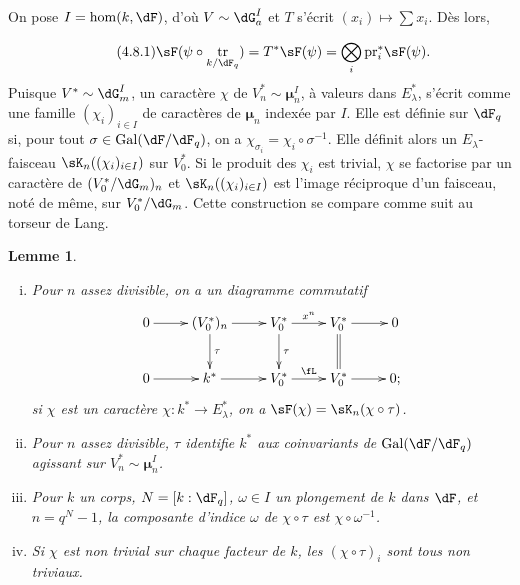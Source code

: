 \documentclass[oneside]{book}
\DeclareMathOperator{\gal}{Gal}
\DeclareMathOperator{\tr}{tr}
\newcommand{\dmu}{{\bm\mu}}
\newcommand{\pr}{\mathrm{pr}} %
\theoremstyle{sga-source}
\theoremstyle{sga-source-dash}
\theoremstyle{sga-source-dotdash}
\theoremstyle{sga-source-number-note-dash}
\theoremstyle{sga-source-note-number-dotdash}
\theoremstyle{sga-source-example-dotdash}
\theoremstyle{sga-source-inline-number}
\theoremstyle{sga-source-bare-number}
\theoremstyle{sga-source}
\newtheorem{lemma_}[subsection]{Lemme}
\newcommand{\PrintPage}[1]{}\newcommand{\MathPage}[1]{}\newcommand{\PrintCite}[2]{#1}\newcommand{\var}[3]{#2}
\begin{document}
On pose $I=\hom(k,\dF)$, d'où $V\sim \dG_a^I$ et $T$ s'écrit 
$(x_i)\mapsto \sum x_i$. Dès lors, 
\PrintPage{200}
\begin{equation*}\tag{4.8.1}\label{VI:eq:4-8-1}
  \sF(\psi\circ \tr_{k/\dF_q}) = T^\ast \sF(\psi) = \bigotimes_i \pr_i^\ast \sF(\psi) \text{.} 
\end{equation*}
Puisque $V^\ast\sim \dG_m^I$, un caractère $\chi$ de $V_n^\ast\sim \dmu_n^I$, 
à valeurs dans $E_\lambda^\ast$, s'écrit comme une famille 
$(\chi_i)_{i\in I}$ de caractères de $\dmu_n$ \var{indénée par $I$}{indexée par $I$}{S45-SOL-0817}. Elle est 
définie sur $\dF_q$ si, pour tout $\sigma\in \gal(\dF/\dF_q)$, on a 
$\chi_{\sigma_i} = \chi_i\circ \sigma^{-1}$. Elle définit alors un 
$E_\lambda$-faisceau $\sK_n((\chi_i)_{i\in I})$ sur $V_0^\ast$. Si le produit 
des $\chi_i$ est trivial, $\chi$ se factorise par un caractère de 
$(V_0^\ast/\dG_m)_n$ et $\sK_n((\chi_i)_{i\in I})$ est l'image réciproque 
d'un faisceau, noté de même, sur $V_0^\ast/\dG_m$. Cette construction se 
compare comme suit au torseur de Lang. 





\begin{lemma_}\label{VI:4-9}
\begin{enumerate}[(i)]
  \item Pour $n$ assez divisible, on a un diagramme commutatif 
    \[\xymatrix{
      0 \ar[r] 
        & (V_0^\ast)_n \ar[r] \ar[d]^-\tau 
        & V_0^\ast \ar[r]^-{x^n} \ar[d]^-\tau 
        & V_0^\ast \ar[r] \ar@{=}[d] 
        & 0 \\
      0 \ar[r] 
        & k^\ast \ar[r] 
        & V_0^\ast \ar[r]^-\fL 
        & V_0^\ast \ar[r] 
        & 0 \text{;} 
    }\]
    si $\chi$ est un caractère $\chi:k^\ast \to E_\lambda^\ast$, on a 
    $\sF(\chi) = \sK_n(\chi\circ\tau)$. 
  \item Pour $n$ assez divisible, $\tau$ identifie $k^\ast$ aux coinvariants 
    de $\var{\gal(\bar\dF/F)}{\gal(\dF/\dF_q)}{S45-SOL-0819}$ agissant sur $V_n^\ast\sim \dmu_n^I$. 
  \item Pour $k$ un corps, $N=[k:\dF_q]$, $\omega\in I$ un plongement de $k$ 
    dans $\dF$, et $n=q^N-1$, la composante d'indice $\omega$ de 
    $\chi\circ\tau$ est $\chi\circ \omega^{-1}$. 
  \item Si $\chi$ est non trivial sur chaque facteur de $k$, les 
    $(\chi\circ \tau)_i$ sont tous non triviaux. 
\end{enumerate}
\end{lemma_}
\end{document}

